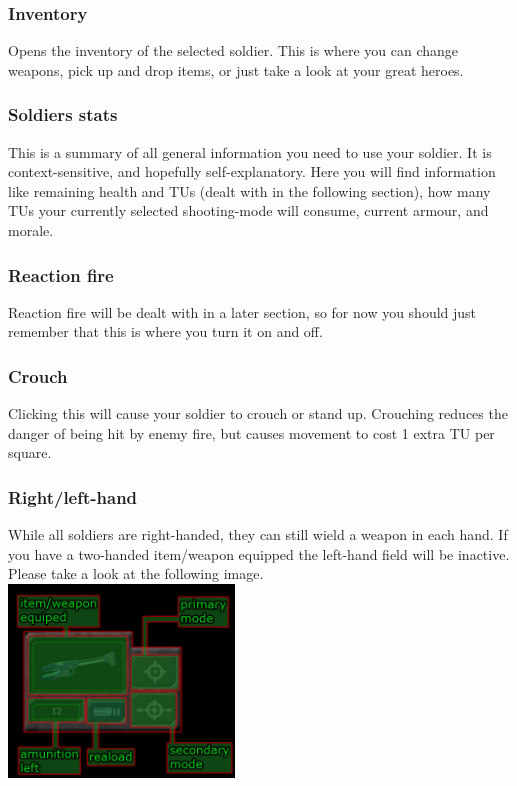 \subsubsection{Inventory}
Opens the inventory of the selected soldier. This is where you can change weapons, pick up and drop items, or just take a look at your great heroes.

\subsubsection{Soldiers stats}
This is a summary of all general information you need to use your soldier. It is context-sensitive, and hopefully self-explanatory.  Here you will find information like remaining health and TUs (dealt with in the following section), how many TUs your currently selected shooting-mode will consume, current armour, and morale.

\subsubsection{Reaction fire}
Reaction fire will be dealt with in a later section, so for now you should just remember that this is where you turn it on and off.

\subsubsection{Crouch}
Clicking this will cause your soldier to crouch or stand up.  Crouching reduces the danger of being hit by enemy fire, but causes movement to cost 1 extra TU per square.

\subsubsection{Right/left-hand}
While all soldiers are right-handed, they can still wield a weapon in each hand. If you have a two-handed item/weapon equipped the left-hand field will be inactive. Please take a look at the following image.\\
\includegraphics[width=6cm]{images/HUD_detail_final.jpg}

